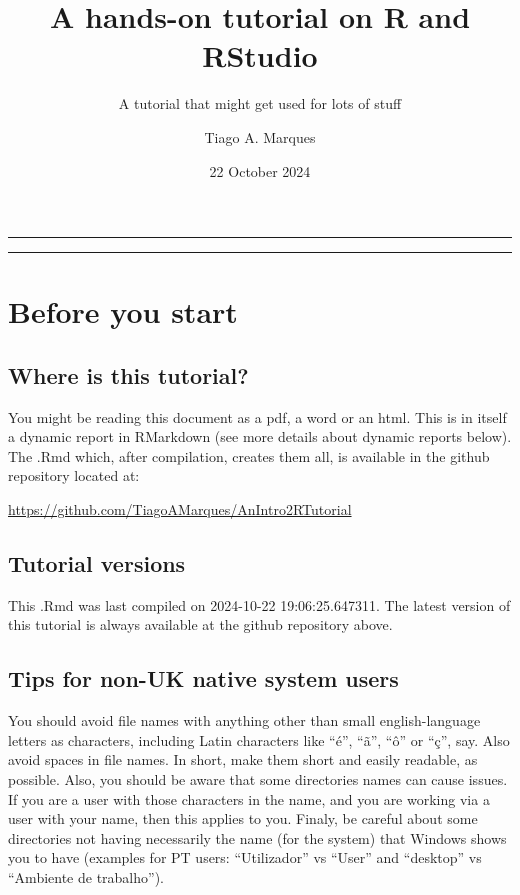 \documentclass[
]{article}
\title{A hands-on tutorial on R and RStudio}
\subtitle{A tutorial that might get used for lots of stuff}
\author{Tiago A. Marques}
\date{22 October 2024}
\begin{document}
\maketitle

{
\hypersetup{linkcolor=}
\setcounter{tocdepth}{3}
\tableofcontents
}
\begin{center}\rule{0.5\linewidth}{0.5pt}\end{center}

\begin{center}\rule{0.5\linewidth}{0.5pt}\end{center}

\newpage

\section{Before you start}\label{before-you-start}

\subsection{Where is this tutorial?}\label{where-is-this-tutorial}

You might be reading this document as a pdf, a word or an html. This is
in itself a dynamic report in RMarkdown (see more details about dynamic
reports below). The .Rmd which, after compilation, creates them all, is
available in the github repository located at:

\url{https://github.com/TiagoAMarques/AnIntro2RTutorial}

\subsection{Tutorial versions}\label{tutorial-versions}

This .Rmd was last compiled on 2024-10-22 19:06:25.647311. The latest
version of this tutorial is always available at the github repository
above.

\subsection{Tips for non-UK native system
users}\label{tips-for-non-uk-native-system-users}

You should avoid file names with anything other than small
english-language letters as characters, including Latin characters like
``é'', ``ã'', ``ô'' or ``ç'', say. Also avoid spaces in file names. In
short, make them short and easily readable, as possible. Also, you
should be aware that some directories names can cause issues. If you are
a user with those characters in the name, and you are working via a user
with your name, then this applies to you. Finaly, be careful about some
directories not having necessarily the name (for the system) that
Windows shows you to have (examples for PT users: ``Utilizador'' vs
``User'' and ``desktop'' vs ``Ambiente de trabalho'').
\end{document}
